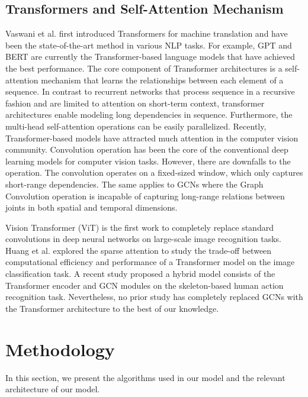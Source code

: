 \documentclass[letterpaper]{article} %
\begin{document}
\subsection{Transformers and Self-Attention Mechanism}
Vaswani et al. \cite{attn2017all} first introduced Transformers for machine translation and have been the state-of-the-art method in various NLP tasks. For example, GPT and BERT \cite{radford2018improving, devlin-etal-2019-bert} are currently the Transformer-based language models that have achieved the best performance. The core component of Transformer architectures is a self-attention mechanism that learns the relationships between each element of a sequence. In contrast to recurrent networks that process sequence in a recursive fashion and are limited to attention on short-term context, transformer architectures enable modeling long dependencies in sequence. Furthermore, the multi-head self-attention operations can be easily parallelized. Recently, Transformer-based models have attracted much attention in the computer vision community. Convolution operation has been the core of the conventional deep learning models for computer vision tasks. However, there are downfalls to the operation. The convolution operates on a fixed-sized window, which only captures short-range dependencies. The same applies to GCNs where the Graph Convolution operation is incapable of capturing long-range relations between joints in both spatial and temporal dimensions. 

Vision Transformer (ViT) \cite{dosovitskiy2020image} is the first work to completely replace standard convolutions in deep neural networks on large-scale image recognition tasks. Huang et al. \cite{huang2019ccnet} explored the sparse attention to study the trade-off between computational efficiency and performance of a Transformer model on the image classification task. A recent study \cite{plizzari2020spatial} proposed a hybrid model consists of the Transformer encoder and GCN modules on the skeleton-based human action recognition task. Nevertheless, no prior study has completely replaced GCNs with the Transformer architecture to the best of our knowledge.

\section{Methodology}
 
In this section, we present the algorithms used in our model and the relevant architecture of our model. 
\end{document}
